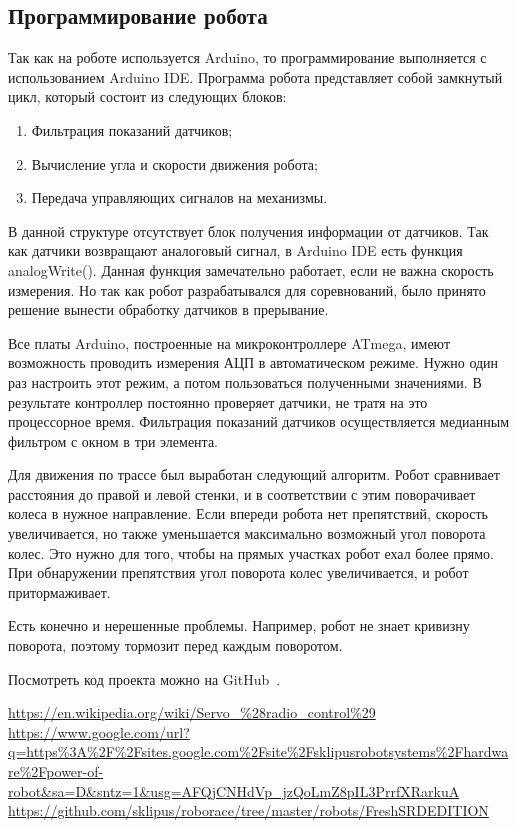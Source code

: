 \documentclass[10pt, a5paper]{article}
\begin{document}
\subsection*{Программирование робота}

Так как на роботе используется Arduino, то программирование выполняется с использованием Arduino IDE. Программа робота представляет собой замкнутый цикл, который состоит из следующих блоков:

\begin{enumerate}
  \item Фильтрация показаний датчиков;
  \item Вычисление угла и скорости движения робота;
  \item Передача управляющих сигналов на механизмы.
\end{enumerate}

В данной структуре отсутствует блок получения информации от датчиков. Так как датчики возвращают аналоговый сигнал, в Arduino IDE есть функция analogWrite(). Данная функция замечательно работает, если не важна скорость измерения. Но так как робот разрабатывался для соревнований, было принято решение вынести обработку датчиков в прерывание.

Все  платы Arduino, построенные на микроконтроллере ATmega, имеют возможность проводить измерения АЦП в автоматическом режиме. Нужно один раз настроить этот режим, а потом пользоваться полученными значениями. В результате контроллер постоянно проверяет датчики, не тратя на это процессорное время. Фильтрация показаний датчиков осуществляется медианным фильтром с окном в три элемента.

Для движения по трассе был выработан следующий алгоритм. Робот сравнивает расстояния до правой и левой стенки, и в соответствии с этим поворачивает колеса в нужное направление. Если впереди робота нет препятствий, скорость  увеличивается, но также уменьшается максимально возможный угол поворота колес. Это нужно для того, чтобы на прямых участках робот ехал более прямо. При обнаружении препятствия угол поворота колес увеличивается, и робот притормаживает.

Есть конечно и нерешенные проблемы. Например, робот не знает кривизну поворота, поэтому тормозит перед каждым поворотом.

Посмотреть код проекта можно на GitHub~\cite{Sklipus3}.

\begin{thebibliography}{99}

 \url{https://en.wikipedia.org/wiki/Servo\_\%28radio\_control\%29}
 \url{https://www.google.com/url?q=https\%3A\%2F\%2Fsites.google.com\%2Fsite\%2Fsklipusrobotsystems\%2Fhardware\%2Fpower-of-robot\&sa=D\&sntz=1\&usg=AFQjCNHdVp\_jzQoLmZ8pIL3PrrfXRarkuA}
 \url{https://github.com/sklipus/roborace/tree/master/robots/FreshSRDEDITION}
\end{thebibliography}
\end{document}
